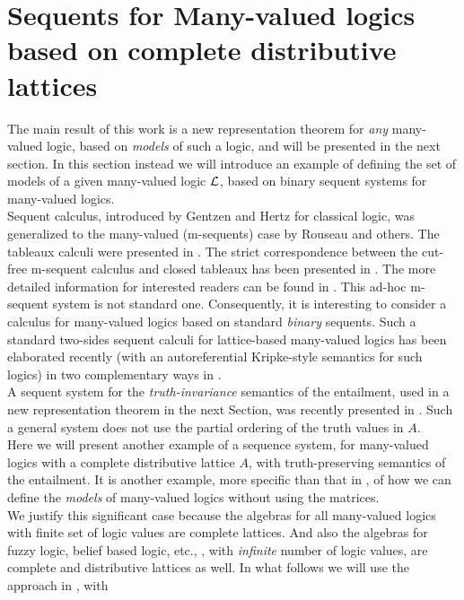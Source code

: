\documentclass[10pt,twocolumn]{article}
\begin{document}
\section{Sequents for Many-valued logics based on complete distributive lattices}
The main result of this work is a new representation theorem for
\emph{any} many-valued logic, based on \emph{models} of such a
logic, and will be presented in the next section. In this section
instead we will introduce an example of defining the set of models
of a given many-valued logic $\mathcal{L}$, based on binary sequent systems
for many-valued logics. \\
Sequent calculus, introduced by Gentzen \cite{Gent32} and Hertz
\cite{Hert29} for classical logic, was generalized to the
many-valued (m-sequents) case by Rouseau \cite{Rous67} and others.
The tableaux calculi were presented in \cite{Carni87,Hanh91}. The
strict correspondence between the cut-free m-sequent calculus and
closed tableaux has been presented in \cite{BFZa93a}. The more
detailed information for interested readers can be found in
\cite{BFZa93,BFSa00}. This ad-hoc m-sequent system is not standard
one. Consequently, it is interesting to consider a calculus for
many-valued logics based on standard \emph{binary} sequents.
Such a standard two-sides sequent
  calculi for  lattice-based many-valued logics
has been  elaborated  recently (with an autoreferential Kripke-style semantics for such
  logics) in two complementary ways in
  \cite{Majk06ml,Majk08dC}.\\
A sequent system for the \emph{truth-invariance} semantics of the
entailment, used in a new representation theorem in the next
Section, was recently presented in \cite{Majk09BS}. Such a general system does not use the partial ordering of the truth values in $A$. \\
 Here we will present another example of a sequence system, for many-valued logics with a
complete distributive lattice $A$, with truth-preserving semantics
of the entailment. It is another example, more specific than that in
\cite{Majk09BS},  of how we can define
the \emph{models} of many-valued logics without using the matrices.\\
We justify this significant case because the algebras for all
many-valued logics with finite set of logic values are complete
lattices. And also the algebras for fuzzy logic, belief based logic,
etc., \cite{Majk06Bi}, with \emph{infinite} number of logic values,
are complete and distributive lattices as well.
In what follows we will use the approach in \cite{Majk08dC}, with
\end{document}
